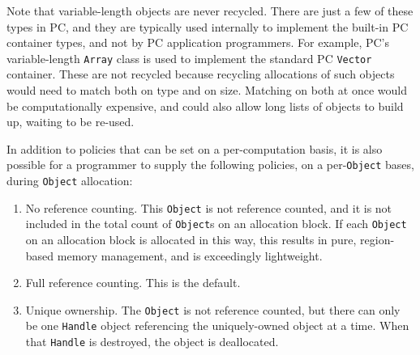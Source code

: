 Note that
variable-length objects are never recycled.  There are just a few of these types in PC, and they are typically
used internally to implement the built-in PC container
types, and not by PC application programmers.  For example, PC's variable-length
\texttt{Array} class is used to implement the standard PC \texttt{Vector} container.  
These are not recycled because recycling allocations of such objects would need to match both on type and on size.  Matching on both at once would 
be computationally expensive, and could also allow long lists of objects to build up, waiting to be re-used.

In addition to policies that can be set on a per-computation basis,
it is also possible for a programmer to supply the following policies, on a per-\texttt{Object} bases, during \texttt{Object} allocation:

\begin{enumerate}

\item No reference counting.  This \texttt{Object} is not reference counted, and it is not included in the total count of \texttt{Object}s on an allocation
block.  If each \texttt{Object} on an allocation block
is allocated in this way, this results in pure, region-based memory management, and is exceedingly lightweight.
\item Full reference counting.  This is the default.
\item Unique ownership.  The \texttt{Object} is not reference counted, but there can only be one \texttt{Handle} object referencing the uniquely-owned
object at a time.  When that \texttt{Handle} is destroyed, the object is deallocated.

\end{enumerate}


